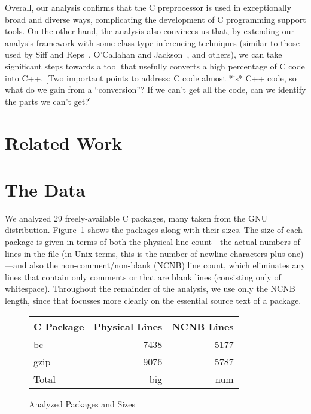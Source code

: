 Overall, our analysis confirms that the C preprocessor is used in
exceptionally broad and diverse ways, complicating the development of C
programming support tools.  On the other hand, the analysis also
convinces us that, by extending our analysis framework with some class
type inferencing techniques (similar to those used by Siff and
Reps~\cite{Siff-fse96}, O'Callahan and Jackson~\cite{OCallahan-icse97},
and others), we can take significant steps towards a tool that usefully
converts a high percentage of C code into C++.  [Two important points to
address: C code almost *is* C++ code, so what do we gain from a
``conversion''?  If we can't get all the code, can we identify the parts
we can't get?]

\section{Related Work}\label{sec:related}

\section{The Data}\label{sec:gathering}

We analyzed 29 freely-available C packages, many taken from the GNU
distribution.  Figure~\ref{fig:packages} shows the packages along with
their sizes.  The size of each package is given in terms of both the
physical line count---the actual numbers of lines in the file (in Unix
terms, this is the number of newline characters plus one)---and also the
non-comment/non-blank (NCNB) line count, which eliminates any lines that
contain only comments or that are blank lines (consisting only of
whitespace).  Throughout the remainder of the analysis, we use only the
NCNB length, since that focusses more clearly on the essential source
text of a package.

\begin{figure}
\begin{tabular}{|l|r|r|}\\\hline
C Package & Physical Lines & NCNB Lines\\\hline\hline
bc & 7438 & 5177\\\hline
gzip & 9076 & 5787\\\hline

Total & big & num\\\hline
\end{tabular}

\caption{Analyzed Packages and Sizes\label{fig:packages}}
\end{figure}

